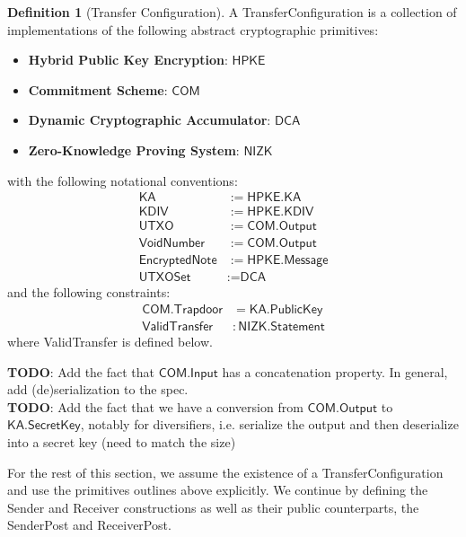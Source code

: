 \documentclass[a4paper]{article}
\newcommand{\TODO}[1]{{\color{red}\textbf{TODO}}: #1}
\theoremstyle{definition}
\newtheorem{definition}{Definition}[subsection]
\newcommand{\COM}{{\textsf{COM}}}
\newcommand{\DCA}{{\textsf{DCA}}}
\newcommand{\EncryptedNote}{{\textsf{EncryptedNote}}}
\newcommand{\HPKE}{{\textsf{HPKE}}}
\newcommand{\Input}{{\textsf{Input}}}
\newcommand{\KA}{{\textsf{KA}}}
\newcommand{\KDIV}{{\textsf{KDIV}}}
\newcommand{\Message}{{\textsf{Message}}}
\newcommand{\NIZK}{{\textsf{NIZK}}}
\newcommand{\Output}{{\textsf{Output}}}
\newcommand{\PublicKey}{{\textsf{PublicKey}}}
\newcommand{\ReceiverPost}{{\textsf{ReceiverPost}}}
\newcommand{\Receiver}{{\textsf{Receiver}}}
\newcommand{\SecretKey}{{\textsf{SecretKey}}}
\newcommand{\SenderPost}{{\textsf{SenderPost}}}
\newcommand{\Sender}{{\textsf{Sender}}}
\newcommand{\Statement}{{\textsf{Statement}}}
\newcommand{\TransferConfiguration}{{\textsf{TransferConfiguration}}}
\newcommand{\Trapdoor}{{\textsf{Trapdoor}}}
\newcommand{\UTXOSet}{{\textsf{UTXOSet}}}
\newcommand{\UTXO}{{\textsf{UTXO}}}
\newcommand{\ValidTransfer}{{\textsf{ValidTransfer}}}
\newcommand{\VoidNumber}{{\textsf{VoidNumber}}}
\begin{document}
\begin{definition}[Transfer Configuration]
    A \TransferConfiguration{} is a collection of implementations of the following abstract cryptographic primitives:
    \begin{itemize}
        \item \textbf{Hybrid Public Key Encryption}: $\HPKE$
        \item \textbf{Commitment Scheme}: $\COM$
        \item \textbf{Dynamic Cryptographic Accumulator}: $\DCA$
        \item \textbf{Zero-Knowledge Proving System}: $\NIZK$
    \end{itemize}
    with the following notational conventions:
    \begin{align*}
        \KA            &:= \HPKE.\KA \\
        \KDIV          &:= \HPKE.\KDIV \\
        \UTXO          &:= \COM.\Output \\
        \VoidNumber    &:= \COM.\Output \\
        \EncryptedNote &:= \HPKE.\Message \\
        \UTXOSet       &:= \DCA
    \end{align*}
    and the following constraints:
    \begin{align*}
        \COM.\Trapdoor &= \KA.\PublicKey \\
        \ValidTransfer &: \NIZK.\Statement
    \end{align*}
    where \ValidTransfer{} is defined below.

    \TODO{Add the fact that $\COM.\Input$ has a concatenation property. In general, add (de)serialization to the spec.} \\
    \TODO{Add the fact that we have a conversion from $\COM.\Output$ to $\KA.\SecretKey$, notably for diversifiers, i.e. serialize the output and then deserialize into a secret key (need to match the size)}
\end{definition}

For the rest of this section, we assume the existence of a \TransferConfiguration{} and use the primitives outlines above explicitly. We continue by defining the \Sender{} and \Receiver{} constructions as well as their public counterparts, the \SenderPost{} and \ReceiverPost{}.
\end{document}
